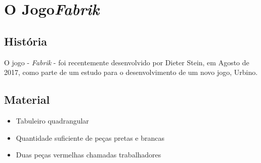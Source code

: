 \documentclass[a4paper]{article}
\begin{document}
%
%
%
%
%
%
%

\tableofcontents
\newpage

\section{O Jogo\textit{Fabrik}}

\subsection{História}
O jogo - \textit{Fabrik} - foi recentemente desenvolvido por Dieter Stein, em Agosto de 2017, como parte de um estudo para o desenvolvimento de um novo jogo, Urbino.

\subsection{Material}
\begin{itemize}
	\item Tabuleiro quadrangular
	\item Quantidade suficiente de peças pretas e brancas
	\item Duas peças vermelhas chamadas trabalhadores
\end{itemize}
\end{document}
